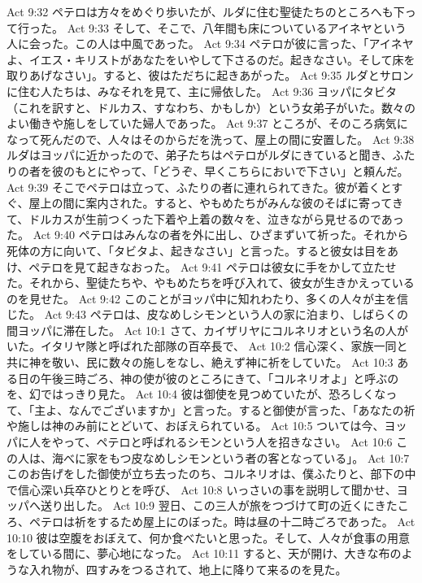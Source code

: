 Act 9:32  ペテロは方々をめぐり歩いたが、ルダに住む聖徒たちのところへも下って行った。
Act 9:33  そして、そこで、八年間も床についているアイネヤという人に会った。この人は中風であった。
Act 9:34  ペテロが彼に言った、「アイネヤよ、イエス・キリストがあなたをいやして下さるのだ。起きなさい。そして床を取りあげなさい」。すると、彼はただちに起きあがった。
Act 9:35  ルダとサロンに住む人たちは、みなそれを見て、主に帰依した。
Act 9:36  ヨッパにタビタ（これを訳すと、ドルカス、すなわち、かもしか）という女弟子がいた。数々のよい働きや施しをしていた婦人であった。
Act 9:37  ところが、そのころ病気になって死んだので、人々はそのからだを洗って、屋上の間に安置した。
Act 9:38  ルダはヨッパに近かったので、弟子たちはペテロがルダにきていると聞き、ふたりの者を彼のもとにやって、「どうぞ、早くこちらにおいで下さい」と頼んだ。
Act 9:39  そこでペテロは立って、ふたりの者に連れられてきた。彼が着くとすぐ、屋上の間に案内された。すると、やもめたちがみんな彼のそばに寄ってきて、ドルカスが生前つくった下着や上着の数々を、泣きながら見せるのであった。
Act 9:40  ペテロはみんなの者を外に出し、ひざまずいて祈った。それから死体の方に向いて、「タビタよ、起きなさい」と言った。すると彼女は目をあけ、ペテロを見て起きなおった。
Act 9:41  ペテロは彼女に手をかして立たせた。それから、聖徒たちや、やもめたちを呼び入れて、彼女が生きかえっているのを見せた。
Act 9:42  このことがヨッパ中に知れわたり、多くの人々が主を信じた。
Act 9:43  ペテロは、皮なめしシモンという人の家に泊まり、しばらくの間ヨッパに滞在した。
Act 10:1  さて、カイザリヤにコルネリオという名の人がいた。イタリヤ隊と呼ばれた部隊の百卒長で、
Act 10:2  信心深く、家族一同と共に神を敬い、民に数々の施しをなし、絶えず神に祈をしていた。
Act 10:3  ある日の午後三時ごろ、神の使が彼のところにきて、「コルネリオよ」と呼ぶのを、幻ではっきり見た。
Act 10:4  彼は御使を見つめていたが、恐ろしくなって、「主よ、なんでございますか」と言った。すると御使が言った、「あなたの祈や施しは神のみ前にとどいて、おぼえられている。
Act 10:5  ついては今、ヨッパに人をやって、ペテロと呼ばれるシモンという人を招きなさい。
Act 10:6  この人は、海べに家をもつ皮なめしシモンという者の客となっている」。
Act 10:7  このお告げをした御使が立ち去ったのち、コルネリオは、僕ふたりと、部下の中で信心深い兵卒ひとりとを呼び、
Act 10:8  いっさいの事を説明して聞かせ、ヨッパへ送り出した。
Act 10:9  翌日、この三人が旅をつづけて町の近くにきたころ、ペテロは祈をするため屋上にのぼった。時は昼の十二時ごろであった。
Act 10:10  彼は空腹をおぼえて、何か食べたいと思った。そして、人々が食事の用意をしている間に、夢心地になった。
Act 10:11  すると、天が開け、大きな布のような入れ物が、四すみをつるされて、地上に降りて来るのを見た。
